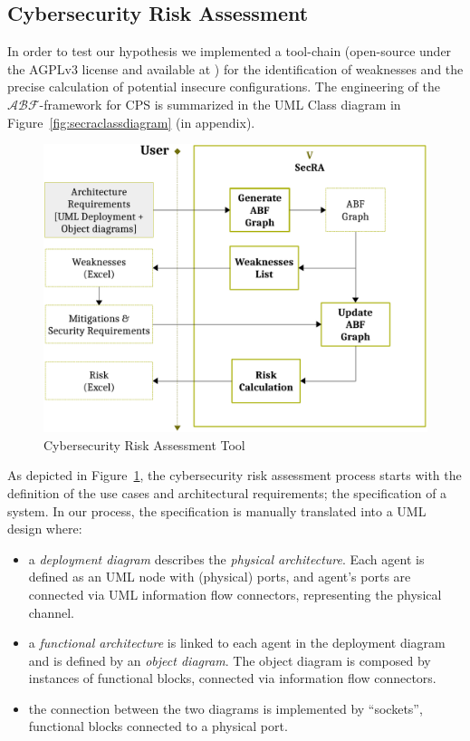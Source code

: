 \documentclass[conference]{IEEEtran}
\newcommand{\assertionRegion}{\mathcal{A}}
\newcommand{\beliefRegion}{\mathcal{B}}
\newcommand{\factRegion}{\mathcal{F}}
\newcommand{\abftheory}{\assertionRegion\beliefRegion\factRegion}
\begin{document}
\subsection{Cybersecurity Risk Assessment}\label{sec:secra}
In order to test our hypothesis we implemented a tool-chain (open-source under the
AGPLv3 license and available at \autocite{v-research2020cybersecurity}) for the
identification of weaknesses and the precise calculation of potential insecure
configurations. The engineering of the $\abftheory$-framework for CPS is summarized in the UML
Class diagram in Figure~\ref{fig:secraclassdiagram} (in appendix). 

\begin{figure}
	\centering
	\includegraphics[width=.9\columnwidth]{v-secra.pdf}
	\caption{Cybersecurity Risk Assessment Tool}
	\label{fig:secra}
\end{figure}
As depicted in Figure~\ref{fig:secra}, the cybersecurity risk assessment process
starts with the definition of the use cases and architectural requirements; the
specification of a system.  In our process, the specification is manually
translated into a UML design where:
\begin{itemize}
	\item a \emph{deployment diagram} describes the \emph{physical
		architecture}. Each agent is defined as an UML node with (physical)
		ports, and agent's ports are connected via UML information flow
		connectors, representing the physical channel.
	\item a \emph{functional architecture} is linked to each agent in the
		deployment diagram and is defined by an \emph{object diagram}.
		The object diagram is composed by instances of functional
		blocks, connected via information flow connectors.
	\item the connection between the two diagrams is implemented by
		``sockets'', functional blocks connected to a 
		physical port.
\end{itemize}
\end{document}
